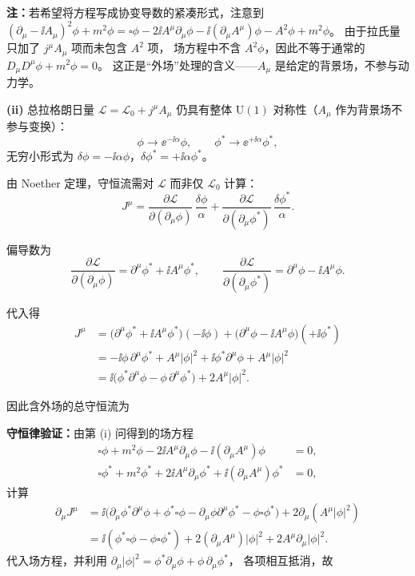 \begin{question}[复标量电子场]
\begin{solution}
\textbf{注：}若希望将方程写成协变导数的紧凑形式，注意到
$(\partial_{\mu}-\ii A_{\mu})^{2}\phi+m^{2}\phi
=\square\phi-2\ii A^{\mu}\partial_{\mu}\phi-\ii(\partial_{\mu}A^{\mu})\phi-A^{2}\phi+m^{2}\phi$。
由于拉氏量只加了 $j^{\mu}A_{\mu}$ 项而未包含 $A^{2}$ 项，
场方程中不含 $A^{2}\phi$，因此不等于通常的 $D_{\mu}D^{\mu}\phi+m^{2}\phi=0$。
这正是``外场''处理的含义——$A_{\mu}$ 是给定的背景场，不参与动力学。

\textbf{(ii)} 总拉格朗日量 $\mathcal{L}=\mathcal{L}_{0}+j^{\mu}A_{\mu}$ 仍具有整体 $\mathrm{U}(1)$ 对称性（$A_{\mu}$ 作为背景场不参与变换）：
\[
\phi\to\ee^{-\ii\alpha}\phi,\qquad
\phi^{*}\to\ee^{+\ii\alpha}\phi^{*},
\]
无穷小形式为 $\delta\phi=-\ii\alpha\phi$，$\delta\phi^{*}=+\ii\alpha\phi^{*}$。

由 Noether 定理，守恒流需对 $\mathcal{L}$ 而非仅 $\mathcal{L}_{0}$ 计算：
\[
J^{\mu}
=\frac{\partial\mathcal{L}}{\partial(\partial_{\mu}\phi)}\,\frac{\delta\phi}{\alpha}
+\frac{\partial\mathcal{L}}{\partial(\partial_{\mu}\phi^{*})}\,\frac{\delta\phi^{*}}{\alpha}.
\]

偏导数为
\[
\frac{\partial\mathcal{L}}{\partial(\partial_{\mu}\phi)}
=\partial^{\mu}\phi^{*}+\ii A^{\mu}\phi^{*},\qquad
\frac{\partial\mathcal{L}}{\partial(\partial_{\mu}\phi^{*})}
=\partial^{\mu}\phi-\ii A^{\mu}\phi.
\]

代入得
\begin{align*}
J^{\mu}
&=\bigl(\partial^{\mu}\phi^{*}+\ii A^{\mu}\phi^{*}\bigr)(-\ii\phi)
+\bigl(\partial^{\mu}\phi-\ii A^{\mu}\phi\bigr)(+\ii\phi^{*}) \\[2pt]
&=-\ii\phi\,\partial^{\mu}\phi^{*}+A^{\mu}|\phi|^{2}
+\ii\phi^{*}\partial^{\mu}\phi+A^{\mu}|\phi|^{2} \\[2pt]
&=\ii\bigl(\phi^{*}\partial^{\mu}\phi-\phi\,\partial^{\mu}\phi^{*}\bigr)
+2A^{\mu}|\phi|^{2}.
\end{align*}

因此含外场的总守恒流为


\textbf{守恒律验证：}由第 (i) 问得到的场方程
\begin{align*}
\square\phi+m^{2}\phi-2\ii A^{\mu}\partial_{\mu}\phi-\ii(\partial_{\mu}A^{\mu})\phi &=0,\\
\square\phi^{*}+m^{2}\phi^{*}+2\ii A^{\mu}\partial_{\mu}\phi^{*}+\ii(\partial_{\mu}A^{\mu})\phi^{*} &=0,
\end{align*}
计算
\begin{align*}
\partial_{\mu}J^{\mu}&=
\ii\bigl(\partial_{\mu}\phi^{*}\partial^{\mu}\phi+\phi^{*}\square\phi
-\partial_{\mu}\phi\partial^{\mu}\phi^{*}-\phi\square\phi^{*}\bigr)
+2\partial_{\mu}(A^{\mu}|\phi|^{2}) \\[2pt]
&=\ii(\phi^{*}\square\phi-\phi\square\phi^{*})
+2(\partial_{\mu}A^{\mu})|\phi|^{2}+2A^{\mu}\partial_{\mu}|\phi|^{2}.
\end{align*}
代入场方程，并利用 $\partial_{\mu}|\phi|^{2}=\phi^{*}\partial_{\mu}\phi+\phi\,\partial_{\mu}\phi^{*}$，
各项相互抵消，故


\end{solution}
\end{question}
